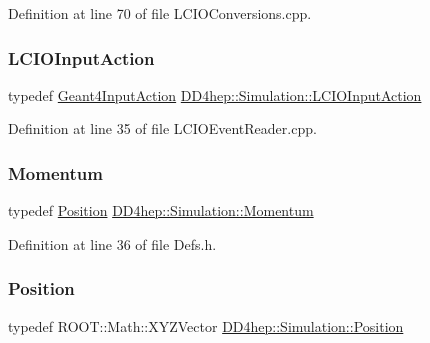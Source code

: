 Definition at line 70 of file L\+C\+I\+O\+Conversions.\+cpp.

\hypertarget{namespace_d_d4hep_1_1_simulation_a1e6fc5fffc58682e1f7cfb8baa1f0987}{}\label{namespace_d_d4hep_1_1_simulation_a1e6fc5fffc58682e1f7cfb8baa1f0987} 
\subsubsection{\texorpdfstring{L\+C\+I\+O\+Input\+Action}{LCIOInputAction}}
{\footnotesize\ttfamily typedef \hyperlink{class_d_d4hep_1_1_simulation_1_1_geant4_input_action}{Geant4\+Input\+Action} \hyperlink{namespace_d_d4hep_1_1_simulation_a1e6fc5fffc58682e1f7cfb8baa1f0987}{D\+D4hep\+::\+Simulation\+::\+L\+C\+I\+O\+Input\+Action}}



Definition at line 35 of file L\+C\+I\+O\+Event\+Reader.\+cpp.

\hypertarget{namespace_d_d4hep_1_1_simulation_aead01eb580dc503a5abba194d179c963}{}\label{namespace_d_d4hep_1_1_simulation_aead01eb580dc503a5abba194d179c963} 
\subsubsection{\texorpdfstring{Momentum}{Momentum}}
{\footnotesize\ttfamily typedef \hyperlink{namespace_d_d4hep_1_1_geometry_a55083902099d03506c6db01b80404900}{Position} \hyperlink{namespace_d_d4hep_1_1_simulation_aead01eb580dc503a5abba194d179c963}{D\+D4hep\+::\+Simulation\+::\+Momentum}}



Definition at line 36 of file Defs.\+h.

\hypertarget{namespace_d_d4hep_1_1_simulation_ad6fd94b3439e31d1ba4b2e640d578558}{}\label{namespace_d_d4hep_1_1_simulation_ad6fd94b3439e31d1ba4b2e640d578558} 
\subsubsection{\texorpdfstring{Position}{Position}}
{\footnotesize\ttfamily typedef R\+O\+O\+T\+::\+Math\+::\+X\+Y\+Z\+Vector \hyperlink{namespace_d_d4hep_1_1_geometry_a55083902099d03506c6db01b80404900}{D\+D4hep\+::\+Simulation\+::\+Position}}



